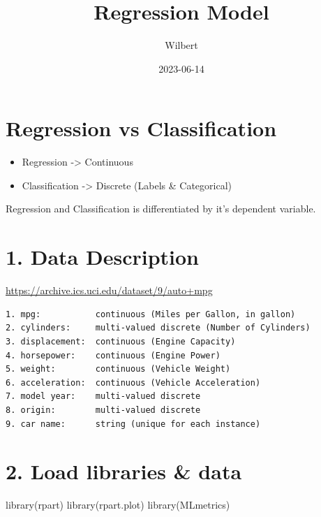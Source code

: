 \documentclass[
]{article}
\title{Regression Model}
\author{Wilbert}
\date{2023-06-14}
\newenvironment{Shaded}{\begin{snugshade}}{\end{snugshade}}
\newcommand{\FunctionTok}[1]{\textcolor[rgb]{0.00,0.00,0.00}{#1}}
\newcommand{\NormalTok}[1]{#1}
\providecommand{\tightlist}{%
  \setlength{\itemsep}{0pt}\setlength{\parskip}{0pt}}
\begin{document}
\maketitle

\hypertarget{regression-vs-classification}{%
\section{Regression vs
Classification}\label{regression-vs-classification}}

\begin{itemize}
\tightlist
\item
  Regression -\textgreater{} Continuous
\item
  Classification -\textgreater{} Discrete (Labels \& Categorical)
\end{itemize}

Regression and Classification is differentiated by it's dependent
variable.

\hypertarget{data-description}{%
\section{1. Data Description}\label{data-description}}

\url{https://archive.ics.uci.edu/dataset/9/auto+mpg}

\begin{verbatim}
1. mpg:           continuous (Miles per Gallon, in gallon)
2. cylinders:     multi-valued discrete (Number of Cylinders)
3. displacement:  continuous (Engine Capacity)
4. horsepower:    continuous (Engine Power)
5. weight:        continuous (Vehicle Weight)
6. acceleration:  continuous (Vehicle Acceleration)
7. model year:    multi-valued discrete
8. origin:        multi-valued discrete
9. car name:      string (unique for each instance)
\end{verbatim}

\hypertarget{load-libraries-data}{%
\section{2. Load libraries \& data}\label{load-libraries-data}}

\begin{Shaded}
\begin{Highlighting}[]
\FunctionTok{library}\NormalTok{(rpart)}
\FunctionTok{library}\NormalTok{(rpart.plot)}
\FunctionTok{library}\NormalTok{(MLmetrics) }
\end{Highlighting}
\end{Shaded}
\end{document}
